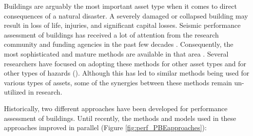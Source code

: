 Buildings are arguably the most important asset type when it comes to direct consequences of a natural disaster. A severely damaged or collapsed building may result in loss of life, injuries, and significant capital losses. Seismic performance assessment of buildings has received a lot of attention from the research community and funding agencies in the past few decades \citep{atc1985atc13, fema1997guidelines, fajfar2004performancebased, kircher2006hazus}. Consequently, the most sophisticated and mature methods are available in that area \citep{atc2012p-58}. Several researchers have focused on adopting these methods for other asset types \citep{werner2006redars, chmielewski2016response} and for other types of hazards (\cite{vickery2006hazus, bernardini2015performance, attary2017performancebased, barbato2013performancebased, lange2014application}). Although this has led to similar methods being used for various types of assets, some of the synergies between these methods remain un-utilized in research.

Historically, two different approaches have been developed for performance assessment of buildings. Until recently, the methods and models used in these approaches improved in parallel (Figure \ref{fig:perf_PBEapproaches}):


